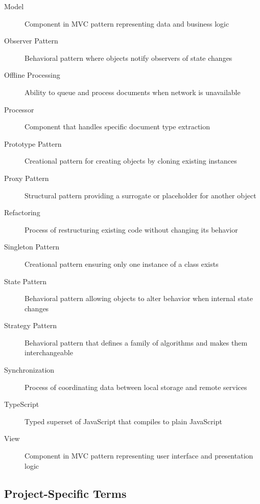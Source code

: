 \documentclass[11pt, a4paper]{article}
\theoremstyle{plain}
\theoremstyle{definition}
\begin{document}
\begin{description}
    \item[Model] Component in MVC pattern representing data and business logic
    
    \item[Observer Pattern] Behavioral pattern where objects notify observers of state changes
    
    \item[Offline Processing] Ability to queue and process documents when network is unavailable
    
    \item[Processor] Component that handles specific document type extraction
    
    \item[Prototype Pattern] Creational pattern for creating objects by cloning existing instances
    
    \item[Proxy Pattern] Structural pattern providing a surrogate or placeholder for another object
    
    \item[Refactoring] Process of restructuring existing code without changing its behavior
    
    \item[Singleton Pattern] Creational pattern ensuring only one instance of a class exists
    
    \item[State Pattern] Behavioral pattern allowing objects to alter behavior when internal state changes
    
    \item[Strategy Pattern] Behavioral pattern that defines a family of algorithms and makes them interchangeable
    
    \item[Synchronization] Process of coordinating data between local storage and remote services
    
    \item[TypeScript] Typed superset of JavaScript that compiles to plain JavaScript
    
    \item[View] Component in MVC pattern representing user interface and presentation logic
\end{description}

\subsection{Project-Specific Terms}
\end{document}
